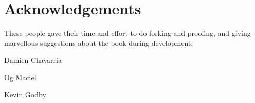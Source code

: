 \chapter{Acknowledgements}
These people gave their time and effort to do forking and proofing, and giving marvellous suggestions about the book during development:

Damien Chavarria

Og Maciel

Kevin Godby
